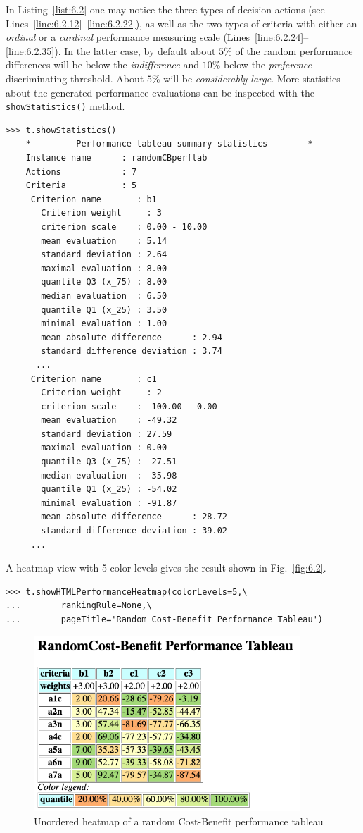 In Listing~\vref{list:6.2} one may notice the three types of decision actions (see Lines~\ref{line:6.2.12}--\ref{line:6.2.22}), as well as the two types  of criteria with either an \emph{ordinal} or a \emph{cardinal} performance measuring scale (Lines~\ref{line:6.2.24}--\ref{line:6.2.35}). In the latter case, by default about $5\%$ of the random performance differences will be below the \emph{indifference} and $10\%$ below the \emph{preference} discriminating threshold. About $5\%$ will be \emph{considerably large}. More statistics about the generated performance evaluations can be inspected with the \texttt{showStatistics()} method.
\begin{lstlisting}
>>> t.showStatistics()
    *-------- Performance tableau summary statistics -------*
    Instance name      : randomCBperftab
    Actions            : 7
    Criteria           : 5
     Criterion name       : b1
       Criterion weight     : 3
       criterion scale    : 0.00 - 10.00
       mean evaluation    : 5.14
       standard deviation : 2.64
       maximal evaluation : 8.00
       quantile Q3 (x_75) : 8.00
       median evaluation  : 6.50
       quantile Q1 (x_25) : 3.50
       minimal evaluation : 1.00
       mean absolute difference      : 2.94
       standard difference deviation : 3.74
      ...
     Criterion name       : c1
       Criterion weight     : 2
       criterion scale    : -100.00 - 0.00
       mean evaluation    : -49.32
       standard deviation : 27.59
       maximal evaluation : 0.00
       quantile Q3 (x_75) : -27.51
       median evaluation  : -35.98
       quantile Q1 (x_25) : -54.02
       minimal evaluation : -91.87
       mean absolute difference      : 28.72
       standard difference deviation : 39.02
     ...
\end{lstlisting}

A heatmap view with 5 color levels gives the result shown in Fig.~\vref{fig:6.2}.
\begin{lstlisting}
>>> t.showHTMLPerformanceHeatmap(colorLevels=5,\
...        rankingRule=None,\
...        pageTitle='Random Cost-Benefit Performance Tableau')
 \end{lstlisting}
\begin{figure}[ht]
\includegraphics[width=10cm]{Figures/6-2-randomCBHeatmap.png}
\caption{Unordered heatmap of a random Cost-Benefit performance tableau}
\label{fig:6.2}       %
\end{figure}
 

